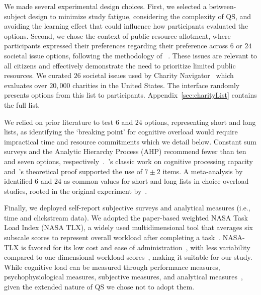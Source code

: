 We made several experimental design choices. First, we selected a between-subject design to minimize study fatigue, considering the complexity of QS, and avoiding the learning effect that could influence how participants evaluated the options. Second, we chose the context of public resource allotment, where participants expressed their preferences regarding their preference across $6$ or $24$ societal issue options, following the methodology of ~\textcite{chengCanShowWhat2021}. These issues are relevant to all citizens and effectively demonstrate the need to prioritize limited public resources. We curated $26$ societal issues used by Charity Navigator~\cite{CharityNavigator2023} which evaluates over $20,000$ charities in the United States. The interface randomly presents options from this list to participants. Appendix~\ref{sec:charityList} contains the full list.

We relied on prior literature to test $6$ and $24$ options, representing short and long lists, as identifying the `breaking point' for cognitive overload would require impractical time and resource commitments which we detail below. Constant sum surveys and the Analytic Hierarchy Process (AHP) recommend fewer than ten and seven options, respectively~\cite{moroneyQuestionnaireDesignHow2019, saatyGroupDecisionMaking2013, saatyPrinciplesAnalyticHierarchy1987}.~\textcite{millerMagicalNumberSeven1956}'s classic work on cognitive processing capacity and~\textcite{saaty2003magic}'s theoretical proof supported the use of $7\pm2$ items. A meta-analysis by~\textcite{chernevChoiceOverloadConceptual2015} identified $6$ and $24$ as common values for short and long lists in choice overload studies, rooted in the original experiment by~\textcite{iyengarWhenChoiceDemotivating2000}.

Finally, we deployed self-report subjective surveys and analytical measures (i.e., time and clickstream data). We adopted the paper-based weighted NASA Task Load Index (NASA TLX), a widely used multidimensional tool that averages six subscale scores to represent overall workload after completing a task~\cite{hart1988development, hartNasaTaskLoadIndex2006, cain2007review}. NASA-TLX is favored for its low cost and ease of administration~\cite{gaoMentalWorkloadMeasurement2013}, with less variability compared to one-dimensional workload scores~\cite{rubioEvaluationSubjectiveMental2004}, making it suitable for our study. While cognitive load can be measured through performance measures, psychophysiological measures, subjective measures, and analytical measures~\cite{gaoMentalWorkloadMeasurement2013}, given the extended nature of QS we chose not to adopt them.

